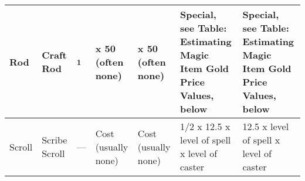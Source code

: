 \begin{longtable}{llllllllllllll}
{\begin{minipage}[t]{0.472in}
Rod \end{minipage}} & \multicolumn{1}{p{0.639in}|}{\begin{minipage}[t]{0.639in}\raggedright
Craft Rod \end{minipage}} & \multicolumn{1}{p{0.497in}|}{\begin{minipage}[t]{0.497in}\centering
\textsuperscript{\textbf{1 }}\end{minipage}} & \multicolumn{1}{p{0.564in}|}{\begin{minipage}[t]{0.564in}\centering
x 50 (often none)\end{minipage}} & \multicolumn{1}{p{0.544in}|}{\begin{minipage}[t]{0.544in}\raggedright
x 50 (often none) \end{minipage}} & \multicolumn{1}{p{0.739in}|}{\begin{minipage}[t]{0.739in}\raggedright
Special, see Table: Estimating Magic Item Gold Price Values, below\end{minipage}} & \multicolumn{8}{p{1.044in}|}{\begin{minipage}[t]{1.044in}\raggedright
Special, see Table: Estimating Magic Item Gold Price Values, below\end{minipage}}\\
\hline
\multicolumn{1}{|p{0.472in}|}{\begin{minipage}[t]{0.472in}\centering
Scroll \end{minipage}} & \multicolumn{1}{p{0.639in}|}{\begin{minipage}[t]{0.639in}\raggedright
Scribe Scroll \end{minipage}} & \multicolumn{1}{p{0.497in}|}{\begin{minipage}[t]{0.497in}\raggedright
--- \end{minipage}} & \multicolumn{1}{p{0.564in}|}{\begin{minipage}[t]{0.564in}\raggedright
Cost (usually none) \end{minipage}} & \multicolumn{1}{p{0.544in}|}{\begin{minipage}[t]{0.544in}\raggedright
Cost (usually none) \end{minipage}} & \multicolumn{1}{p{0.739in}|}{\begin{minipage}[t]{0.739in}\raggedright
1/2 x 12.5 x level of spell x level of caster\end{minipage}} & \multicolumn{8}{p{1.044in}|}{\begin{minipage}[t]{1.044in}\raggedright
12.5 x level of spell x level of caster\end{minipage}}\\

\end{longtable}
